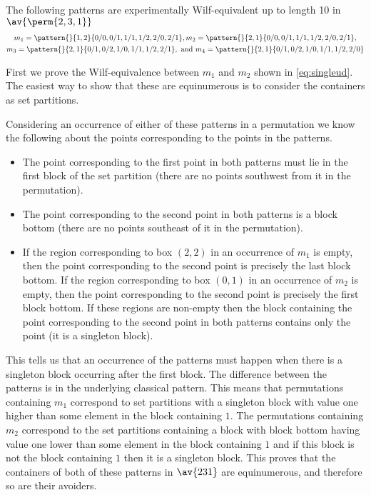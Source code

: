 \subsection{}
\nextvar
The following patterns are experimentally Wilf-equivalent up to length 10 in
\(\av{\perm{2,3,1}}\)
\begin{gather}
    m_1 = \pattern{}{1,2}{0/0,0/1,1/1,1/2,2/0,2/1},
    m_2 = \pattern{}{2,1}{0/0,0/1,1/1,1/2,2/0,2/1}, \label{eq:singleud}\\
    m_3 = \pattern{}{2,1}{0/1,0/2,1/0,1/1,1/2,2/1}, \text{ and }
    m_4 = \pattern{}{2,1}{0/1,0/2,1/0,1/1,1/2,2/0} \label{eq:other}
\end{gather}

First we prove the Wilf-equivalence between \(m_1\) and \(m_2\) shown in
\eqref{eq:singleud}. The easiest way to
show that these are equinumerous is to consider the containers as set partitions.

Considering an occurrence of either of these patterns in a permutation  we know
the following about the points corresponding to the points in the patterns.
\begin{itemize}
    \item The point corresponding to the first point in both patterns
        must lie in the first block of the set partition (there are
        no points southwest from it in the permutation).
    \item The point corresponding to the second point in both patterns
        is a block bottom (there are no points southeast of it in
        the permutation).
    \item If the region corresponding to box \((2,2)\) in an occurrence of
    \(m_1\) is empty, then the point corresponding to the second point is
    precisely the last block bottom. If the region corresponding to box \((0,1)\)
    in an occurrence of \(m_2\) is empty, then the point corresponding to the
    second point is precisely the first block bottom.
    If these regions are non-empty then the block containing the point
    corresponding to the second point in both patterns contains only the point
    (it is a singleton block).
\end{itemize}
This tells us that an occurrence of the patterns must happen when there
is a singleton block occurring after the first block. The difference
between the patterns is in the underlying classical pattern. This
means that permutations containing \(m_1\) correspond to set partitions
with a singleton block with value one higher than some element in the
block containing \(1\). The permutations containing \(m_2\) correspond
to the set partitions containing a block with block bottom having value
one lower than some element in the block containing \(1\) and if this
block is not the block containing \(1\) then it is a singleton block. This
proves that the containers of both of these patterns in \(\av{231}\) are
equinumerous, and therefore so are their avoiders.

